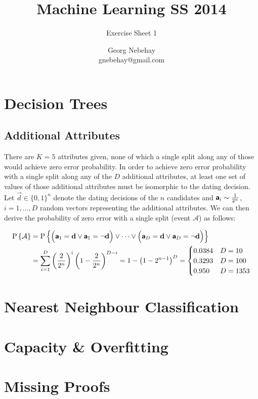 \documentclass{scrartcl}
\title{Machine Learning SS 2014}
\subtitle{Exercise Sheet 1}
\author{Georg Nebehay\\gnebehay@gmail.com}
\date{}
\begin{document}
\maketitle

\section{Decision Trees}



\subsection{Additional Attributes}
There are $K=5$ attributes given, none of which a single split along any of those would achieve zero error probability. In order to achieve zero error probability with a single split along any of the $D$ additional attributes, at least one set of values of those additional attributes must be isomorphic to the dating decision. Let $\vec d \in \lbrace 0,1\rbrace^n$ denote the dating decisions of the $n$ candidates and ${\textbf{\textsf{a}}}_i \sim \frac{1}{2^n}$, $i=1,\dots,D$  random vectors representing the additional attributes. We can then derive the probability of zero error with a single split (event $\mathcal A$) as follows:

\begin{align}
	\Prob{\mathcal A}& = 
	\Prob{ \Big(\rvec a_1 = \vec d \vee \rvec a_1 = \neg \vec d \Big) \vee 
		\dots \vee \Big(\rvec a_D = \vec d \vee \rvec a_D = \neg \vec d \Big)} \\
	&= \sum_{i=1}^{D}  \left( \frac{2}{2^n} \right)^i  \left( 1-\frac{2}{2^n}\right)^{D-i} 
	= 1- \left( 1-2^{n-1} \right)^{D} 
	= \begin{cases} 0.0384 &D=10 \\  0.3293 &D=100 \\ 0.950 &D=1353\end{cases}
\end{align}

\section{Nearest Neighbour Classification}
\section{Capacity \& Overfitting}
\section{Missing Proofs}
\end{document}
